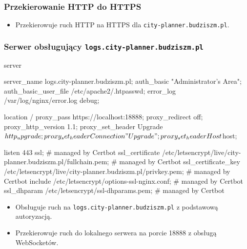\subsubsection{Przekierowanie HTTP do HTTPS}
\begin{itemize}
    \item Przekierowuje ruch HTTP na HTTPS dla \texttt{city-planner.budziszm.pl}.
\end{itemize}

\subsubsection{Serwer obsługujący \texttt{logs.city-planner.budziszm.pl}}
\begin{longlisting}[language=nginx,label={lst:n9}]
server {
  server_name logs.city-planner.budziszm.pl;
  auth_basic           "Administrator's Area";
  auth_basic_user_file /etc/apache2/.htpasswd;
  error_log  /var/log/nginx/error.log debug;

  location / {
    proxy_pass https://localhost:18888;
    proxy_redirect off;
    proxy_http_version 1.1;
    proxy_set_header Upgrade $http_upgrade;
    proxy_set_header Connection "Upgrade";
    proxy_set_header Host $host;
  }

  listen 443 ssl; # managed by Certbot
  ssl_certificate /etc/letsencrypt/live/city-planner.budziszm.pl/fullchain.pem; # managed by Certbot
  ssl_certificate_key /etc/letsencrypt/live/city-planner.budziszm.pl/privkey.pem; # managed by Certbot
  include /etc/letsencrypt/options-ssl-nginx.conf; # managed by Certbot
  ssl_dhparam /etc/letsencrypt/ssl-dhparams.pem; # managed by Certbot
}
\end{longlisting}
\begin{itemize}
    \item Obsługuje ruch na \texttt{logs.city-planner.budziszm.pl} z podstawową autoryzacją.
    \item Przekierowuje ruch do lokalnego serwera na porcie 18888 z obsługą WebSocketów.
\end{itemize}

